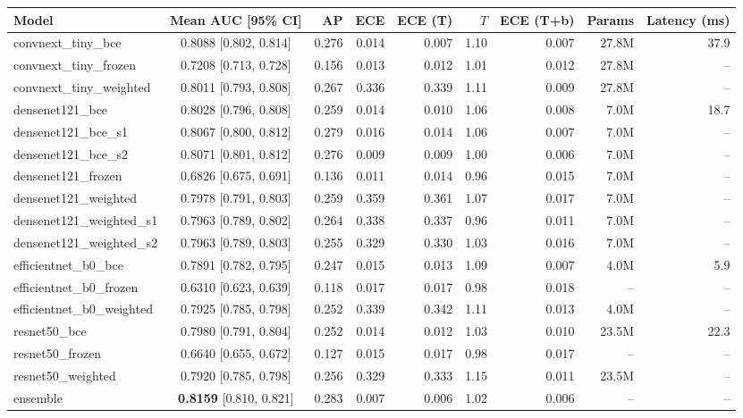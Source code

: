 \begin{tabular}{lcrrrrrrr}
\toprule
Model & Mean AUC [95\% CI] & AP & ECE & ECE (T) & $T$ & ECE (T+b) & Params & Latency (ms) \\
\midrule
convnext\_tiny\_bce & 0.8088 [0.802, 0.814] & 0.276 & 0.014 & 0.007 & 1.10 & 0.007 & 27.8M & 37.9 \\
convnext\_tiny\_frozen & 0.7208 [0.713, 0.728] & 0.156 & 0.013 & 0.012 & 1.01 & 0.012 & 27.8M & -- \\
convnext\_tiny\_weighted & 0.8011 [0.793, 0.808] & 0.267 & 0.336 & 0.339 & 1.11 & 0.009 & 27.8M & -- \\
densenet121\_bce & 0.8028 [0.796, 0.808] & 0.259 & 0.014 & 0.010 & 1.06 & 0.008 & 7.0M & 18.7 \\
densenet121\_bce\_s1 & 0.8067 [0.800, 0.812] & 0.279 & 0.016 & 0.014 & 1.06 & 0.007 & 7.0M & -- \\
densenet121\_bce\_s2 & 0.8071 [0.801, 0.812] & 0.276 & 0.009 & 0.009 & 1.00 & 0.006 & 7.0M & -- \\
densenet121\_frozen & 0.6826 [0.675, 0.691] & 0.136 & 0.011 & 0.014 & 0.96 & 0.015 & 7.0M & -- \\
densenet121\_weighted & 0.7978 [0.791, 0.803] & 0.259 & 0.359 & 0.361 & 1.07 & 0.017 & 7.0M & -- \\
densenet121\_weighted\_s1 & 0.7963 [0.789, 0.802] & 0.264 & 0.338 & 0.337 & 0.96 & 0.011 & 7.0M & -- \\
densenet121\_weighted\_s2 & 0.7963 [0.789, 0.803] & 0.255 & 0.329 & 0.330 & 1.03 & 0.016 & 7.0M & -- \\
efficientnet\_b0\_bce & 0.7891 [0.782, 0.795] & 0.247 & 0.015 & 0.013 & 1.09 & 0.007 & 4.0M & 5.9 \\
efficientnet\_b0\_frozen & 0.6310 [0.623, 0.639] & 0.118 & 0.017 & 0.017 & 0.98 & 0.018 & -- & -- \\
efficientnet\_b0\_weighted & 0.7925 [0.785, 0.798] & 0.252 & 0.339 & 0.342 & 1.11 & 0.013 & 4.0M & -- \\
resnet50\_bce & 0.7980 [0.791, 0.804] & 0.252 & 0.014 & 0.012 & 1.03 & 0.010 & 23.5M & 22.3 \\
resnet50\_frozen & 0.6640 [0.655, 0.672] & 0.127 & 0.015 & 0.017 & 0.98 & 0.017 & -- & -- \\
resnet50\_weighted & 0.7920 [0.785, 0.798] & 0.256 & 0.329 & 0.333 & 1.15 & 0.011 & 23.5M & -- \\
\midrule
ensemble & \textbf{0.8159} [0.810, 0.821] & 0.283 & 0.007 & 0.006 & 1.02 & 0.006 & -- & -- \\
\bottomrule
\end{tabular}
